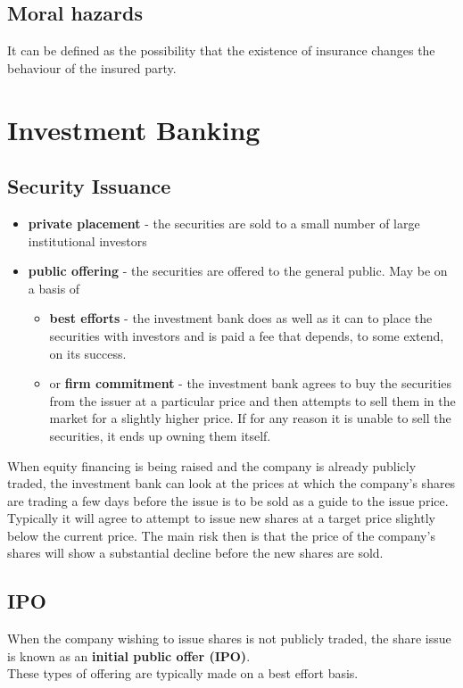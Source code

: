 \subsection{Moral hazards}
It can be defined as the possibility that the existence of insurance changes the behaviour of the insured party.

\section{Investment Banking}

\subsection{Security Issuance}
\begin{itemize}
	\item \textbf{\color{blue}private placement} - the securities are sold to a small number of large institutional investors
	\item \textbf{\color{blue}public offering} - the securities are offered to the general public. May be on a basis of
	\begin{itemize}
		\item \textbf{\color{ForestGreen}best efforts} - the investment bank does as well as it can to place the securities with investors and is paid a fee that depends, to some extend, on its success.
		\item or \textbf{\color{ForestGreen}firm commitment} - the investment bank agrees to buy the securities from the issuer at a particular price and then attempts to sell them in the market for a slightly higher price. If for any reason it is unable to sell the securities, it ends up owning them itself.
	\end{itemize}
\end{itemize}
When equity financing is being raised and the company is already publicly traded, the investment bank can look at the prices at which the company's shares are trading a few days before the issue is to be sold as a guide to the issue price. Typically it will agree to attempt to issue new shares at a target price slightly below the current price. The main risk then is that the price of the company's shares will show a substantial decline before the new shares are sold.

\subsection{IPO}
When the company wishing to issue shares is not publicly traded, the share issue is known as an \textbf{\color{blue}initial public offer (IPO)}.\\
These types of offering are typically made on a best effort basis.\\

